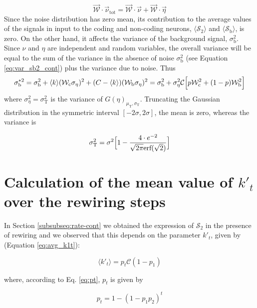 \documentclass[a4paper, 12pt, twoside, openright]{book}
\newcommand{\C}{\mathcal{C}}
\newcommand{\Wb}{\mathcal{W}_\text{b}}
\newcommand{\Wc}{\mathcal{W}_\text{c}}
\newcommand{\SII}{\mathcal{S}_\text{2}}
\newcommand{\Sb}{\mathcal{S}_\text{b}}
\newcommand{\varSb}{\sigma^{2}_\text{b}}
\begin{document}
\begin{equation}
    \vec{\mathcal{W}}\cdot\vec{\nu}_{\text{tot}} = \vec{\mathcal{W}}\cdot\vec{\nu} + \vec{\mathcal{W}}\cdot\vec{\eta}
\end{equation}
Since the noise distribution has zero mean, 
its contribution to the average values of the signals
in input to the coding and non-coding neurons,
$\langle\SII\rangle$ and $\langle\Sb\rangle$, is zero.
On the other hand, it affects the variance
of the background signal, $\varSb$.
Since $\nu$ and $\eta$ are independent and random variables, the overall variance will be equal to the sum of the variance in the absence of noise $\varSb$ 
(see Equation \eqref{eq:var_sb2_cont})
plus the variance due to noise.
Thus
\begin{equation}
\label{eq:noisy_varSb}
    \sigma^{*2}_{\text{b}} =
    \varSb +
    \langle k \rangle
  (\Wc \sigma_{\eta})^2
  + (C - \langle k \rangle)
    (\Wb \sigma_{\eta})^2 =
    \varSb + \sigma^2_{\eta} \C \Bigl[ p \Wc^2 + (1-p)\Wb^2 \Bigr]
\end{equation}
where
$\sigma^2_{\eta} = \sigma^2_{\text{T}}$
is the variance of $G(\eta)_{\mu_{\text{T}}, \sigma_{\text{T}}}$.
Truncating the Gaussian distribution in the symmetric interval $[-2\sigma, 2\sigma]$, the mean is zero, whereas the variance is

\begin{equation}
    \sigma^{2}_{\text{T}}= \sigma^2 \Bigl[1- \frac{4\cdot e^{-2}}{\sqrt{2\pi}\text{erf}(\sqrt{2})} \Bigr]
\end{equation}

\section{Calculation of the mean value of $k'_t$ over the rewiring steps}
\label{app:avg_k1t}
In Section \ref{subsubseq:rate-cont} we obtained the expression of $\SII$ in the presence of rewiring and we observed that this depends on the parameter $k'_t$, given by (Equation \eqref{eq:avg_k1t}):

\begin{equation}
\label{eq:avg_k1t1}
\langle k'_t \rangle = p_t \C ( 1 - p_1 )
\end{equation}

 where, according to Eq. \eqref{eq:pt}, $p_t$ is given by

\begin{equation}
p_t = 1 - (1 - p_1 p_2)^t
\end{equation}
\end{document}
